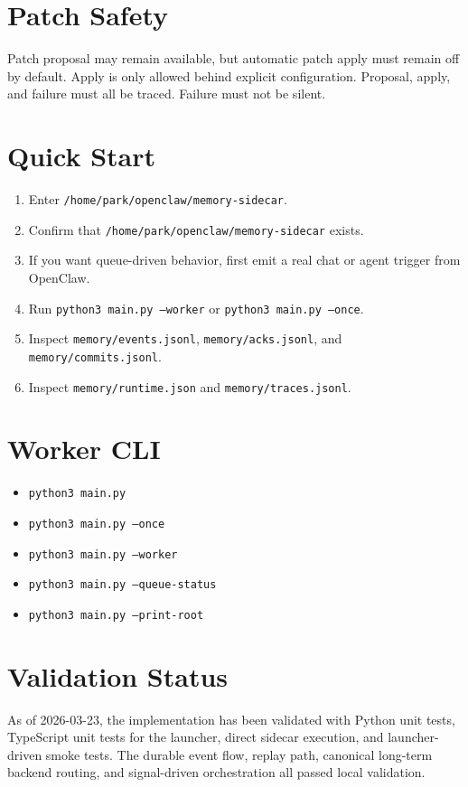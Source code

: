 \documentclass[11pt,a4paper,oneside,openany]{book}
\begin{document}
\chapter{Patch Safety}
Patch proposal may remain available, but automatic patch apply must remain off by default. Apply is only allowed behind explicit configuration. Proposal, apply, and failure must all be traced. Failure must not be silent.
\chapter{Quick Start}
\begin{enumerate}
  \item Enter \texttt{/home/park/openclaw/memory-sidecar}.
  \item Confirm that \texttt{/home/park/openclaw/memory-sidecar} exists.
  \item If you want queue-driven behavior, first emit a real chat or agent trigger from OpenClaw.
  \item Run \texttt{python3 main.py --worker} or \texttt{python3 main.py --once}.
  \item Inspect \texttt{memory/events.jsonl}, \texttt{memory/acks.jsonl}, and \texttt{memory/commits.jsonl}.
  \item Inspect \texttt{memory/runtime.json} and \texttt{memory/traces.jsonl}.
\end{enumerate}
\chapter{Worker CLI}
\begin{itemize}
  \item \texttt{python3 main.py}
  \item \texttt{python3 main.py --once}
  \item \texttt{python3 main.py --worker}
  \item \texttt{python3 main.py --queue-status}
  \item \texttt{python3 main.py --print-root}
\end{itemize}
\chapter{Validation Status}
As of 2026-03-23, the implementation has been validated with Python unit tests, TypeScript unit tests for the launcher, direct sidecar execution, and launcher-driven smoke tests. The durable event flow, replay path, canonical long-term backend routing, and signal-driven orchestration all passed local validation.
\end{document}
